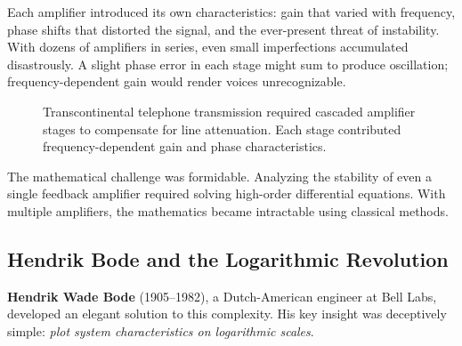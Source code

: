 Each amplifier introduced its own characteristics: gain that varied with frequency, phase shifts that distorted the signal, and the ever-present threat of instability. With dozens of amplifiers in series, even small imperfections accumulated disastrously. A slight phase error in each stage might sum to produce oscillation; frequency-dependent gain would render voices unrecognizable.

\begin{figure}[htbp]
\centering
{}
\caption{Transcontinental telephone transmission required cascaded amplifier stages to compensate for line attenuation. Each stage contributed frequency-dependent gain and phase characteristics.}
\label{fig:cascade_amplifiers}
\end{figure}

The mathematical challenge was formidable. Analyzing the stability of even a single feedback amplifier required solving high-order differential equations. With multiple amplifiers, the mathematics became intractable using classical methods.

\subsection{Hendrik Bode and the Logarithmic Revolution}

\textbf{Hendrik Wade Bode} (1905--1982), a Dutch-American engineer at Bell Labs, developed an elegant solution to this complexity. His key insight was deceptively simple: \textit{plot system characteristics on logarithmic scales}.

